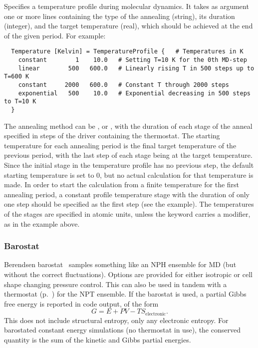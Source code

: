 Specifies a temperature profile during molecular dynamics. It takes as
argument one or more lines containing the type of the annealing
(string), its duration (integer), and the target temperature (real),
which should be achieved at the end of the given period. For example:
\begin{verbatim}
  Temperature [Kelvin] = TemperatureProfile {   # Temperatures in K
    constant        1    10.0   # Setting T=10 K for the 0th MD-step
    linear        500   600.0   # Linearly rising T in 500 steps up to T=600 K
    constant     2000   600.0   # Constant T through 2000 steps
    exponential   500    10.0   # Exponential decreasing in 500 steps to T=10 K
  }
\end{verbatim}
The annealing method can be ,  or
, with the duration of each stage of the anneal
specified in steps of the driver containing the thermostat. The
starting temperature for each annealing period is the final target
temperature of the previous period, with the last step of each stage
being at the target temperature. Since the initial stage in the
temperature profile has no previous step, the default starting
temperature is set to 0, but no actual calculation for that
temperature is made.  In order to start the calculation from a finite
temperature for the first annealing period, a constant profile
temperature stage with the duration of only one step should be
specified as the first step (see the example).  The temperatures of
the stages are specified in atomic units, unless the 
keyword carries a modifier, as in the example above.

\subsubsection{Barostat}
\label{sec:dftbp.Barostat}

Berendsen barostat~\cite{berendsen-JCP-81-3684} samples something like an
NPH ensemble for MD (but without the correct
fluctuations). Options are provided for either isotropic or cell shape changing
pressure control. This can also be used in tandem with a thermostat
(p.~) for the NPT ensemble. If the barostat
is used, a partial Gibbs free energy is reported in code output, of the form
$$G = E + PV - TS_\mathrm{electronic}.$$ This does not include structural
entropy, only any electronic entropy. For barostated constant energy simulations
(no thermostat in use), the conserved quantity is the sum of the kinetic and
Gibbs partial energies.

